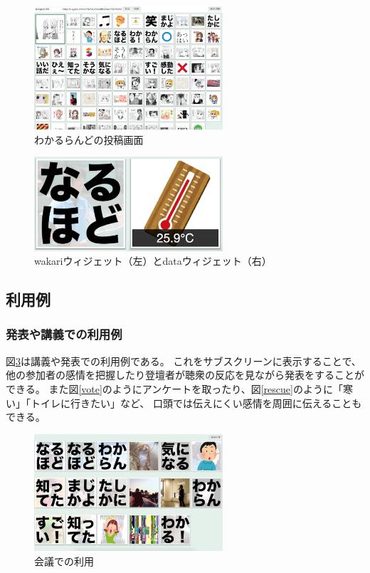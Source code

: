 \begin{figure}[h]
\centering
\includegraphics[width=7cm]{images/console.eps}
\caption{わかるらんどの投稿画面}
\label{console}
\end{figure}

\begin{figure}[h]
\centering
\includegraphics[width=7cm]{images/widget.eps}
\caption{wakariウィジェット（左）とdataウィジェット（右）}
\label{widget}
\end{figure}

\subsection{利用例}

\subsubsection{発表や講義での利用例}

図\ref{discussion}は講義や発表での利用例である。
これをサブスクリーンに表示することで、他の参加者の感情を把握したり登壇者が聴衆の反応を見ながら発表をすることができる。
また図\ref{vote}のようにアンケートを取ったり、図\ref{rescue}のように「寒い」「トイレに行きたい」など、
口頭では伝えにくい感情を周囲に伝えることもできる。

\begin{figure}[h]
\centering
\includegraphics[width=7cm]{images/discussion.eps}
\caption{会議での利用}
\label{discussion}
\end{figure}

